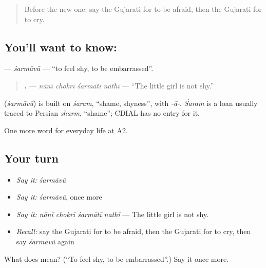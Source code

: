 \label{lesson:GU-C266-sharmavu}



\begin{quote}
Before the new one: say the Gujarati for to be afraid, then the Gujarati for to cry.
\end{quote}

\subsection*{You'll want to know: }
\textbf{} — \emph{śarmāvũ} — \textquotedblleft{}to feel shy, to be embarrassed\textquotedblright{}.

\begin{quote}
\textbf{   .} — \emph{nānī chokrī śarmātī nathī} — \textquotedblleft{}The little girl is not shy.\textquotedblright{}
\end{quote}

\begin{cousinweb}
\textbf{} (\emph{śarmāvũ}) is built on \emph{śaram}, \textquotedblleft{}shame, shyness\textquotedblright{}, with \emph{-ā-}. \emph{Śaram} is a loan usually traced to Persian \emph{sharm}, \textquotedblleft{}shame\textquotedblright{}; CDIAL has no entry for it.
\end{cousinweb}

\begin{grammarlens}[title={What you've built}]
One more word for everyday life at A2.
\end{grammarlens}

\subsection*{Your turn}
\begin{itemize}
\raggedright
  \item \emph{Say it:} \emph{śarmāvũ}
  \item \emph{Say it:} \emph{śarmāvũ}, once more
  \item \emph{Say it:} \emph{nānī chokrī śarmātī nathī} — The little girl is not shy.
  \item \emph{Recall:} say the Gujarati for to be afraid, then the Gujarati for to cry, then say \emph{śarmāvũ} again
\end{itemize}

\begin{tcolorbox}[breakable,colback=teal!4,colframe=teal!35!black,title={Before you move on}]
What does  mean? (\textquotedblleft{}To feel shy, to be embarrassed\textquotedblright{}.) Say it once more.
\end{tcolorbox}
